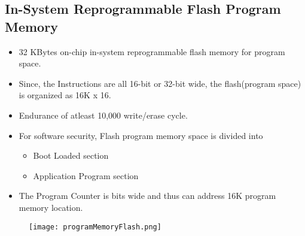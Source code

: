 \subsection{In-System Reprogrammable Flash Program Memory}
\begin{itemize}
    \item 32 KBytes on-chip in-system reprogrammable flash memory for program space.
    \item Since, the Instructions are all 16-bit or  32-bit wide, the flash(program space) is organized as 16K x 16.
    \item Endurance of atleast 10,000 write/erase cycle.
    \item For software security, Flash program memory space is divided into
    \begin{itemize}
        \item Boot Loaded section
        \item Application Program section
    \end{itemize}
    \item The Program Counter is bits wide and thus can address 16K program memory location.\end{itemize}

\begin{figure}[H]
    \begin{center}
        \texttt{[image: programMemoryFlash.png]}
    \end{center}
\end{figure}

